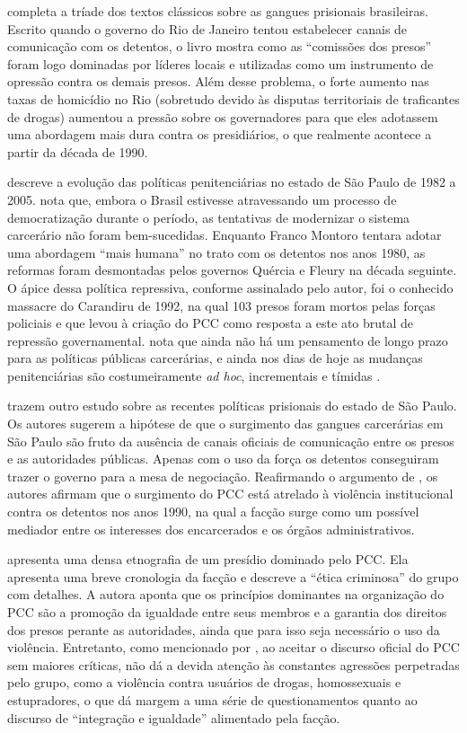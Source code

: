 \documentclass[a4paper,11pt]{article}
\begin{document}
\citet[]{coelho1987oficina} completa a tríade dos textos clássicos sobre as gangues prisionais brasileiras. Escrito quando o governo do Rio de Janeiro tentou estabelecer canais de comunicação com os detentos, o livro mostra como as ``comissões dos presos'' foram logo dominadas por líderes locais e utilizadas como um instrumento de opressão contra os demais presos. Além desse problema, o forte aumento nas taxas de homicídio no Rio (sobretudo devido às disputas territoriais de traficantes de drogas) aumentou a pressão sobre os governadores para que eles adotassem uma abordagem mais dura contra os presidiários, o que realmente acontece a partir da década de 1990.

\citet[]{salla2007montoro} descreve a evolução das políticas penitenciárias no estado de São Paulo de 1982 a 2005. \citeauthor[]{salla2007montoro} nota que, embora o Brasil estivesse atravessando um processo de democratização durante o período, as tentativas de modernizar o sistema carcerário não foram bem-sucedidas. Enquanto Franco Montoro tentara adotar uma abordagem ``mais humana'' no trato com os detentos nos anos 1980, as reformas foram desmontadas pelos governos Quércia e Fleury na década seguinte. O ápice dessa política repressiva, conforme assinalado pelo autor, foi o conhecido massacre do Carandiru de 1992, na qual 103 presos foram mortos pelas forças policiais e que levou à criação do PCC como resposta a este ato brutal de repressão governamental. \citeauthor[]{salla2007montoro} nota que ainda não há um pensamento de longo prazo para as políticas públicas carcerárias, e ainda nos dias de hoje as mudanças penitenciárias são costumeiramente \textit{ad hoc}, incrementais e tímidas \citep[383]{dias2011pulverizaccao}.

\citet[]{alvarez2013comissoes} trazem outro estudo sobre as recentes políticas prisionais do estado de São Paulo. Os autores sugerem a hipótese de que o surgimento das gangues carcerárias em São Paulo são fruto da ausência de canais oficiais de comunicação entre os presos e as autoridades públicas. Apenas com o uso da força os detentos conseguiram trazer o governo para a mesa de negociação. Reafirmando o argumento de \citet[]{salla2007montoro}, os autores afirmam que o surgimento do PCC está atrelado à violência institucional contra os detentos nos anos 1990, na qual a facção surge como um possível mediador entre os interesses dos encarcerados e os órgãos administrativos.

\citet[]{biondi2010junto} apresenta uma densa etnografia de um presídio dominado pelo PCC. Ela apresenta uma breve cronologia da facção e descreve a ``ética criminosa'' do grupo com detalhes. A autora aponta que os princípios dominantes na organização do PCC são a promoção da igualdade entre seus membros e a garantia dos direitos dos presos perante as autoridades, ainda que para isso seja necessário o uso da violência. Entretanto, como mencionado por \citet[376]{dias2011pulverizaccao}, ao aceitar o discurso oficial do PCC sem maiores críticas, \citeauthor[]{biondi2010junto} não dá a devida atenção às constantes agressões perpetradas pelo grupo, como a violência contra usuários de drogas, homossexuais e estupradores, o que dá margem a uma série de questionamentos quanto ao discurso de ``integração e igualdade'' alimentado pela facção.
\end{document}
